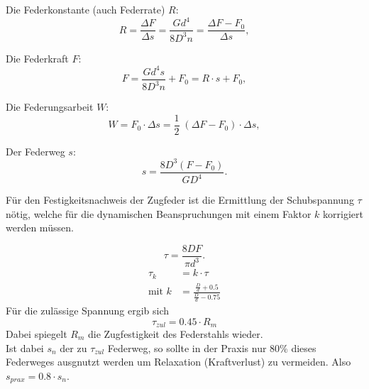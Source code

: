 Die Federkonstante (auch Federrate) $R$:
\begin{equation}
    R=\frac{\Delta F}{\Delta s}=\frac{Gd^4}{8D^3n}=\frac{\Delta F-F_0}{\Delta s},
    \label{eqn:federrate}
\end{equation}

Die Federkraft $F$:
\begin{equation}
    F=\frac{Gd^4s}{8D^3n}+F_0=R \cdot s +F_0,
    \label{eqn:federkraft}
\end{equation}

Die Federungsarbeit $W$:
\begin{equation}
    W=F_0 \cdot \Delta s = \frac{1}{2}\;(\Delta F-F_0) \cdot \Delta s,
    \label{eqn:federungsarbeit}
\end{equation}

Der Federweg $s$:
\begin{equation}
    s=\frac{8D^3(F-F_0)}{GD^4}.
    \label{eqn:federweg}
\end{equation}
\newline




Für den Festigkeitsnachweis der Zugfeder ist die Ermittlung der Schubspannung $\tau$
nötig, welche für die dynamischen Beanspruchungen mit einem Faktor $k$ korrigiert werden müssen.

\begin{equation}
    \tau = \frac{8DF}{\pi d^3}.
    \label{eqn:schubspannung}
\end{equation}
\begin{align}
    \tau_k &= k \cdot \tau\\
    \text{mit }k&=\frac{\frac{D}{d}+0.5}{\frac{D}{d}-0.75}
\end{align}
Für die zulässige Spannung ergib sich
\begin{equation}
    \tau_{zul}=0.45 \cdot R_m
\end{equation}
Dabei spiegelt $R_m$ die Zugfestigkeit des Federstahls wieder.\\
Ist dabei $s_n$ der zu $\tau_{zul}$ Federweg, so sollte in der Praxis nur 80\% dieses
Federweges ausgnutzt werden um Relaxation (Kraftverlust) zu vermeiden.
Also $s_{prax}=0.8 \cdot s_n$.  



\label{sec:theorie}